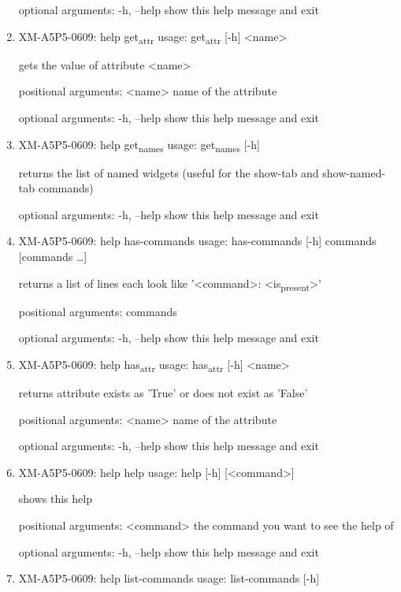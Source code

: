 \documentclass[11pt]{article}
\begin{document}
\begin{enumerate}
optional arguments:
  -h, --help  show this help message and exit

\item XM-A5P5-0609: help get\textsubscript{attr}
\label{sec:orgd45a999}
usage: get\textsubscript{attr} [-h] <name>

gets the value of attribute <name>

positional arguments:
  <name>      name of the attribute

optional arguments:
  -h, --help  show this help message and exit

\item XM-A5P5-0609: help get\textsubscript{names}
\label{sec:orgf0e3f4a}
usage: get\textsubscript{names} [-h]

returns the list of named widgets (useful for the show-tab and show-named-tab
commands)

optional arguments:
  -h, --help  show this help message and exit

\item XM-A5P5-0609: help has-commands
\label{sec:org4b6e8a5}
usage: has-commands [-h] commands [commands \ldots{}]

returns a list of lines each look like '<command>: <is\textsubscript{present}>'

positional arguments:
  commands

optional arguments:
  -h, --help  show this help message and exit

\item XM-A5P5-0609: help has\textsubscript{attr}
\label{sec:org81bb10c}
usage: has\textsubscript{attr} [-h] <name>

returns attribute exists as 'True' or does not exist as 'False'

positional arguments:
  <name>      name of the attribute

optional arguments:
  -h, --help  show this help message and exit

\item XM-A5P5-0609: help help
\label{sec:org6df0bb6}
usage: help [-h] [<command>]

shows this help

positional arguments:
  <command>   the command you want to see the help of

optional arguments:
  -h, --help  show this help message and exit

\item XM-A5P5-0609: help list-commands
\label{sec:org00f1597}
usage: list-commands [-h]


\end{enumerate}
\end{document}
